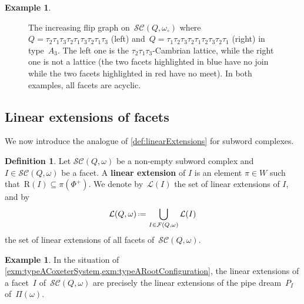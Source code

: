 \documentclass[reqno]{amsart}
\theoremstyle{definition}
\newtheorem{definition}[theorem]{Definition}
\newtheorem{example}[theorem]{Example}
\newcommand{\eqdef}{\mbox{\,\raisebox{0.2ex}{\scriptsize\ensuremath{\mathrm:}}\ensuremath{=}\,}} %
\newcommand{\red}[1]{{\color{red} #1}} %
\newcommand{\defn}[1]{\textbf{\textsf{\color{PineGreen} #1}}} %
\newcommand{\pipeDreams}{\Pi} %
\newcommand{\linearExtensions}{\mathcal{L}} %
\newcommand{\wo}{\omega_\circ} %
\newcommand{\subwordComplex}{\mathcal{SC}} %
\newcommand{\Roots}{\mathrm{R}} %
\newcommand{\subwordFacets}{\mathcal{F}} %
\begin{document}
\begin{example}
\begin{figure}[t]
{
	}
	\caption{The increasing flip graph on~$\subwordComplex(Q, \wo)$ where~$Q = \tau_2 \tau_1 \tau_3 \tau_2 \tau_1 \tau_3 \tau_2 \tau_1 \tau_3$ (left) and~$Q = \tau_1 \tau_2 \tau_3 \tau_2 \tau_1 \tau_2 \tau_3 \tau_2 \tau_1$ (right) in type~$A_3$. The left one is the $\tau_2 \tau_1 \tau_3$-Cambrian lattice, while the right one is not a lattice (the two facets highlighted in blue have no join while the two facets highlighted in red have no meet). In both examples, all facets are acyclic.}
	\label{fig:increasingFlipPosets}
\end{figure}
\end{example}


\subsection{Linear extensions of facets}
\label{subsec:linearExtensionsFacets}

We now introduce the analogue of \cref{def:linearExtensions} for subword complexes.

\begin{definition}
\label{def:linearExtensionsSubwordComplexes}
Let $\subwordComplex(Q,\omega)$ be a non-empty subword complex and $I\in \subwordComplex(Q,\omega)$ be a facet.
A \defn{linear extension} of $I$ is an element $\pi \in W$ such that~$\Roots(I) \subseteq \pi(\Phi^+)$.
We denote by~$\linearExtensions(I)$ the set of linear extensions of $I$, and by
\[
\linearExtensions(Q,\omega) \eqdef \bigcup_{I\in\subwordFacets(Q,\omega)} \linearExtensions(I)
\]
the set of linear extensions of all facets of~$\subwordComplex(Q,\omega)$.
\end{definition}

\begin{example}
In the situation of \cref{exm:typeACoxeterSystem,exm:typeARootConfiguration}, the linear extensions of a facet~$I$ of~$\subwordComplex(Q, \omega)$ are precisely the linear extensions of the pipe dream~$P_I$ of~$\pipeDreams(\omega)$.
\end{example}
\end{document}
